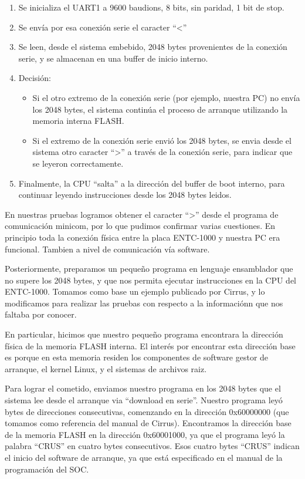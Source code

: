\documentclass[conference]{IEEEtran}
\begin{document}
\begin{enumerate}
\item Se inicializa el UART1 a 9600 baudions, 8 bits, sin paridad, 1 bit de stop.
\item Se envía por esa conexión serie el caracter ``<''
\item Se leen, desde el sistema embebido, 2048 bytes provenientes
de la conexión serie, y se almacenan en una buffer de inicio interno.
\item Decisión:
\begin{itemize}
\item Si el otro extremo de la conexión serie (por ejemplo, nuestra PC) no envía los 2048 bytes, el sistema continúa el proceso de arranque utilizando la memoria interna FLASH.
\item Si el extremo de la conexión serie envió los 2048 bytes, se envia desde el sistema otro caracter ``\textgreater'' a través de la conexión serie, para indicar que 
se leyeron correctamente.
\end{itemize}
\item Finalmente, la CPU ``salta'' a la dirección del buffer de boot interno,
para continuar leyendo instrucciones desde
los 2048 bytes leidos.
\end{enumerate} 



En nuestras pruebas logramos obtener 
el caracter ``\textgreater'' desde el programa de comunicación minicom,
por lo que pudimos confirmar varias cuestiones. En principio
toda la conexión física entre la placa ENTC-1000 y nuestra PC era funcional.
Tambien a nivel de comunicación vía software.

Posteriormente, preparamos un pequeño programa en lenguaje ensamblador que no supere
los 2048 bytes, y que nos permita ejecutar instrucciones en la CPU del 
ENTC-1000. Tomamos como base un ejemplo publicado por Cirrus, y lo modificamos
para realizar las pruebas con respecto a la informaciónn que
nos faltaba por conocer.

En particular, hicimos que nuestro pequeño programa encontrara
la dirección física de la memoria FLASH interna.
El interés por encontrar esta dirección
base es porque en esta memoria residen los componentes de software
gestor de arranque, el kernel Linux, y el sistemas de archivos raiz.

Para lograr el cometido, enviamos nuestro programa en los 2048 bytes
que el sistema lee desde el arranque via ``download en serie''.
Nuestro programa leyó bytes
de direcciones consecutivas, comenzando en la dirección 0x60000000 (que
tomamos como referencia del manual de Cirrus).
Encontramos la dirección base de la memoria FLASH en 
la dirección 0x60001000, ya que el programa leyó la palabra ``CRUS''
en cuatro bytes consecutivos. Esos cuatro bytes ``CRUS'' indican el inicio
del software de arranque, ya que está especificado en el manual
de la programación del SOC.
\end{document}
